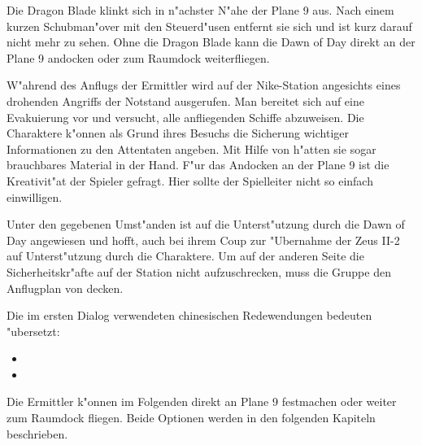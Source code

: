 Die Dragon Blade klinkt sich in n"achster N"ahe der Plane 9 aus. Nach einem kurzen Schubman"over mit den Steuerd"usen entfernt sie sich und ist kurz darauf nicht mehr zu sehen. Ohne die Dragon Blade kann die Dawn of Day direkt an der Plane 9 andocken oder zum Raumdock weiterfliegen.

\begin{remarks}
	W"ahrend des Anflugs der Ermittler wird auf der Nike-Station angesichts eines drohenden Angriffs der Notstand ausgerufen. Man bereitet sich auf eine Evakuierung vor und versucht, alle anfliegenden Schiffe abzuweisen. Die Charaktere k"onnen als Grund ihres Besuchs die Sicherung wichtiger Informationen zu den Attentaten angeben. Mit Hilfe von \ml{} h"atten sie sogar brauchbares Material in der Hand. F"ur das Andocken an der Plane 9 ist die Kreativit"at der Spieler gefragt. Hier sollte der Spielleiter nicht so einfach einwilligen.

	Unter den gegebenen Umst"anden ist \xl{} auf die Unterst"utzung durch die Dawn of Day angewiesen und hofft, auch bei ihrem Coup zur "Ubernahme der Zeus II-2 auf Unterst"utzung durch die Charaktere. Um auf der anderen Seite die Sicherheitskr"afte auf der Station nicht aufzuschrecken, muss die Gruppe den Anflugplan von \xl{} decken.

	Die im ersten Dialog verwendeten chinesischen Redewendungen bedeuten "ubersetzt:
	
	\begin{itemize}
		\item {} 
		\item {} 
	\end{itemize}

	Die Ermittler k"onnen im Folgenden direkt an Plane 9 festmachen oder weiter zum Raumdock fliegen. Beide Optionen werden in den folgenden Kapiteln beschrieben.
\end{remarks}
